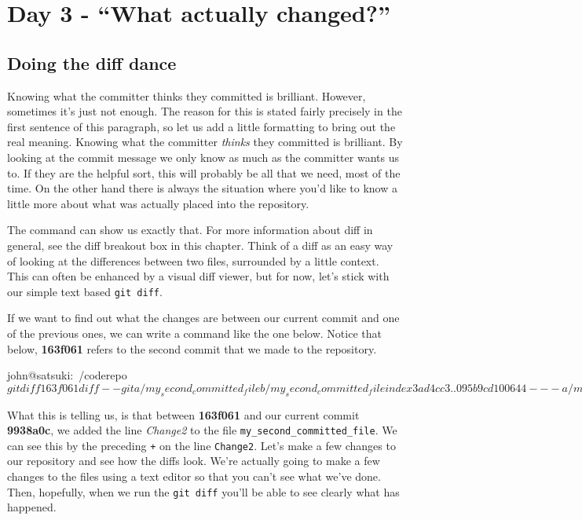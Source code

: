 \section{Day 3 - ``What actually changed?''}
\subsection{Doing the diff dance}
Knowing what the committer thinks they committed is brilliant.
However, sometimes it's just not enough.
The reason for this is stated fairly precisely in the first sentence of this paragraph, so let us add a little formatting to bring out the real meaning.
Knowing what the committer \emph{thinks} they committed is brilliant.
By looking at the commit message we only know as much as the committer wants us to.
If they are the helpful sort, this will probably be all that we need, most of the time.
On the other hand there is always the situation where you'd like to know a little more about what was actually placed into the repository.

The  command can show us exactly that.
For more information about diff in general, see the diff breakout box in this chapter.
Think of a diff as an easy way of looking at the differences between two files, surrounded by a little context.
This can often be enhanced by a visual diff viewer, but for now, let's stick with our simple text based \texttt{git diff}.

If we want to find out what the changes are between our current commit and one of the previous ones, we can write a command like the one below.
Notice that below, \textbf{163f061} refers to the second commit that we made to the repository.

\begin{code}
john@satsuki:~/coderepo$ git diff 163f061
diff --git a/my_second_committed_file b/my_second_committed_file
index 3ad4cc3..095b9cd 100644
--- a/my_second_committed_file
+++ b/my_second_committed_file
@@ -1 +1,2 @@
 Change1
+Change2
john@satsuki:~/coderepo$
\end{code}

What this is telling us, is that between \textbf{163f061} and our current commit \textbf{9938a0c}, we added the line \emph{Change2} to the file \texttt{my\_second\_committed\_file}.
We can see this by the preceding \texttt{+} on the line \texttt{Change2}.
Let's make a few changes to our repository and see how the diffs look.
We're actually going to make a few changes to the files using a text editor so that you can't see what we've done.
Then, hopefully, when we run the \texttt{git diff} you'll be able to see clearly what has happened.


